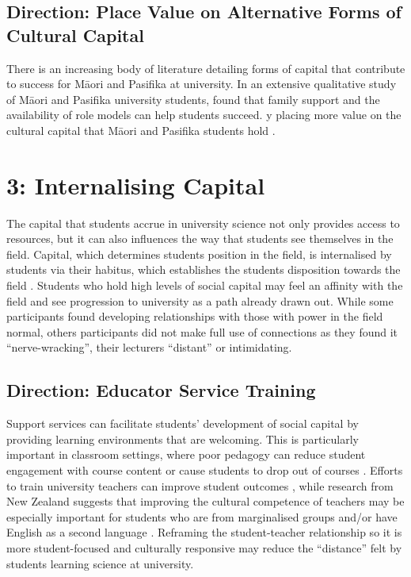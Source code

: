 \subsection{Direction: Place Value on Alternative Forms of Cultural Capital}

There is an increasing body of literature detailing forms of capital that contribute to success for M\={a}ori and Pasifika at university. In an extensive qualitative study of M\={a}ori and Pasifika university students, \citep{mayeda2014you} found that family support and the availability of role models can help students succeed. y placing more value on the cultural capital that M\={a}ori and Pasifika students hold \cite{bishop2009te}.

\section{3: Internalising Capital}
The capital that students accrue in university science not only provides access to resources, but it can also influences the way that students see themselves in the field. Capital, which determines students position in the field, is internalised by students via their habitus, which establishes the students disposition towards the field \cite{Bourdieu1992}. Students who hold high levels of social capital may feel an affinity with the field and see progression to university as a path already drawn out. While some participants found developing relationships with those with power in the field normal, others participants did not make full use of connections as they found it ``nerve-wracking'', their lecturers ``distant'' or intimidating. 


\subsection{Direction: Educator Service Training}
Support services can facilitate students' development of social capital by providing learning environments that are welcoming. This is particularly important in classroom settings, where poor pedagogy can reduce student engagement with course content or cause students to  drop out of courses \cite{russell2011factors}. Efforts to train university teachers can improve student outcomes \cite{gibbs2004impact}, while research from New Zealand suggests that improving the cultural competence of teachers may be especially important for students who are from marginalised groups \cite{ikiua2019pasifika} and/or have English as a second language \cite{campbell2008asian}. Reframing the student-teacher relationship so it is more student-focused \cite{gibbs2004impact} and culturally responsive \cite{ikiua2019pasifika} may reduce the ``distance'' felt by students learning science at university.  

